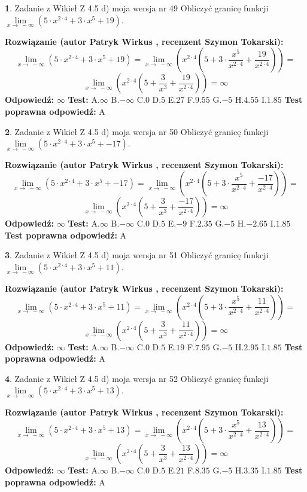 \documentclass[12pt, a4paper]{article}
\theoremstyle{definition} %
\newtheorem{zad}{}
\newcommand{\zadStart}[1]{\begin{zad}#1\newline}
\newcommand{\zadStop}{\end{zad}}
\newcommand{\rozwStart}[2]{\noindent \textbf{Rozwiązanie (autor #1 , recenzent #2): }\newline}
\newcommand{\rozwStop}{\newline}
\newcommand{\odpStart}{\noindent \textbf{Odpowiedź:}\newline}
\newcommand{\odpStop}{\newline}
\newcommand{\testStart}{\noindent \textbf{Test:}\newline}
\newcommand{\testStop}{\newline}
\newcommand{\kluczStart}{\noindent \textbf{Test poprawna odpowiedź:}\newline}
\newcommand{\kluczStop}{\newline}
\begin{document}
\zadStart{Zadanie z Wikieł Z 4.5 d) moja wersja nr 49}
Obliczyć granicę funkcji  $\lim\limits_{x\to\ -\infty}(5 \cdot x^{2\cdot4}+3 \cdot x^{5}+19)$.
\zadStop
\rozwStart{Patryk Wirkus}{Szymon Tokarski}
$$\lim\limits_{x\to\ -\infty}(5 \cdot x^{2\cdot4}+3 \cdot x^{5}+19) = \lim\limits_{x\to\ -\infty}(x^{2\cdot4}(5 +3 \cdot \frac{x^{5}}{x^{2\cdot4}}+\frac{19}{x^{2\cdot4}})) =$$ $$\lim\limits_{x\to\ -\infty}(x^{2\cdot4}(5 +\frac{3}{x^{3}}+\frac{19}{x^{2\cdot4}})) =\infty$$
\rozwStop
\odpStart
$\infty$
\odpStop
\testStart
A.$\infty$ B.$-\infty$ C.$0$ D.$5$ E.$27$
F.$9.55$ G.$-5$
H.$4.55$
I.$1.85$
\testStop
\kluczStart
A
\kluczStop



\zadStart{Zadanie z Wikieł Z 4.5 d) moja wersja nr 50}
Obliczyć granicę funkcji  $\lim\limits_{x\to\ -\infty}(5 \cdot x^{2\cdot4}+3 \cdot x^{5}+-17)$.
\zadStop
\rozwStart{Patryk Wirkus}{Szymon Tokarski}
$$\lim\limits_{x\to\ -\infty}(5 \cdot x^{2\cdot4}+3 \cdot x^{5}+-17) = \lim\limits_{x\to\ -\infty}(x^{2\cdot4}(5 +3 \cdot \frac{x^{5}}{x^{2\cdot4}}+\frac{-17}{x^{2\cdot4}})) =$$ $$\lim\limits_{x\to\ -\infty}(x^{2\cdot4}(5 +\frac{3}{x^{3}}+\frac{-17}{x^{2\cdot4}})) =\infty$$
\rozwStop
\odpStart
$\infty$
\odpStop
\testStart
A.$\infty$ B.$-\infty$ C.$0$ D.$5$ E.$-9$
F.$2.35$ G.$-5$
H.$-2.65$
I.$1.85$
\testStop
\kluczStart
A
\kluczStop



\zadStart{Zadanie z Wikieł Z 4.5 d) moja wersja nr 51}
Obliczyć granicę funkcji  $\lim\limits_{x\to\ -\infty}(5 \cdot x^{2\cdot4}+3 \cdot x^{5}+11)$.
\zadStop
\rozwStart{Patryk Wirkus}{Szymon Tokarski}
$$\lim\limits_{x\to\ -\infty}(5 \cdot x^{2\cdot4}+3 \cdot x^{5}+11) = \lim\limits_{x\to\ -\infty}(x^{2\cdot4}(5 +3 \cdot \frac{x^{5}}{x^{2\cdot4}}+\frac{11}{x^{2\cdot4}})) =$$ $$\lim\limits_{x\to\ -\infty}(x^{2\cdot4}(5 +\frac{3}{x^{3}}+\frac{11}{x^{2\cdot4}})) =\infty$$
\rozwStop
\odpStart
$\infty$
\odpStop
\testStart
A.$\infty$ B.$-\infty$ C.$0$ D.$5$ E.$19$
F.$7.95$ G.$-5$
H.$2.95$
I.$1.85$
\testStop
\kluczStart
A
\kluczStop



\zadStart{Zadanie z Wikieł Z 4.5 d) moja wersja nr 52}
Obliczyć granicę funkcji  $\lim\limits_{x\to\ -\infty}(5 \cdot x^{2\cdot4}+3 \cdot x^{5}+13)$.
\zadStop
\rozwStart{Patryk Wirkus}{Szymon Tokarski}
$$\lim\limits_{x\to\ -\infty}(5 \cdot x^{2\cdot4}+3 \cdot x^{5}+13) = \lim\limits_{x\to\ -\infty}(x^{2\cdot4}(5 +3 \cdot \frac{x^{5}}{x^{2\cdot4}}+\frac{13}{x^{2\cdot4}})) =$$ $$\lim\limits_{x\to\ -\infty}(x^{2\cdot4}(5 +\frac{3}{x^{3}}+\frac{13}{x^{2\cdot4}})) =\infty$$
\rozwStop
\odpStart
$\infty$
\odpStop
\testStart
A.$\infty$ B.$-\infty$ C.$0$ D.$5$ E.$21$
F.$8.35$ G.$-5$
H.$3.35$
I.$1.85$
\testStop
\kluczStart
A
\kluczStop
\end{document}
